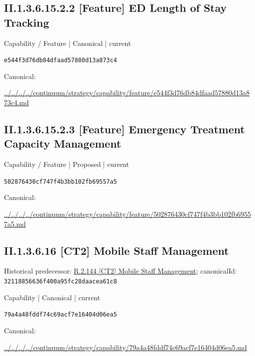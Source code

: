 \documentclass[10pt,a4paper]{article}
\begin{document}
\subsection*{II.1.3.6.15.2.2 [Feature] ED Length of Stay Tracking}
\label{element-e544f3d76db84dfaad57880d13a873c4}
{\small Capability / Feature | Canonical | current}\par
\texttt{e544f3d76db84dfaad57880d13a873c4}\par
Canonical: \par
{\footnotesize\url{../../../../continuum/strategy/capability/feature/e544f3d76db84dfaad57880d13a873c4.md}}\par
\subsection*{II.1.3.6.15.2.3 [Feature] Emergency Treatment Capacity Management}
\label{element-502876430cf747f4b3bb102fb69557a5}
{\small Capability / Feature | Proposed | current}\par
\texttt{502876430cf747f4b3bb102fb69557a5}\par
Canonical: \par
{\footnotesize\url{../../../../continuum/strategy/capability/feature/502876430cf747f4b3bb102fb69557a5.md}}\par
\subsection*{II.1.3.6.16 [CT2] Mobile Staff Management}
Historical predecessor: \hyperref[element-32118856636f400a95fc28daacea61c8]{R.2.144 [CT2] Mobile Staff Management}; canonicalId: \texttt{32118856636f400a95fc28daacea61c8}\par
\label{element-79a4a48fddf74c69acf7e16404d06ea5}
{\small Capability | Canonical | current}\par
\texttt{79a4a48fddf74c69acf7e16404d06ea5}\par
Canonical: \par
{\footnotesize\url{../../../../continuum/strategy/capability/79a4a48fddf74c69acf7e16404d06ea5.md}}\par
\end{document}
